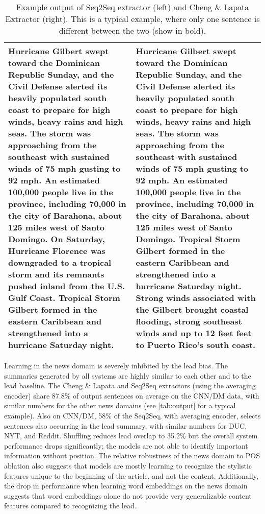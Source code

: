 
\begin{table*}
\centering
  \begin{tabular}{p{20em} p{20em}}
\toprule
Hurricane Gilbert swept toward the Dominican Republic Sunday, and the 
   Civil Defense alerted its heavily populated south coast to prepare 
   for high winds, heavy rains and high seas.                         
The storm was approaching from the southeast with sustained winds of  
   75 mph gusting to 92 mph.                                          
An estimated 100,000 people live in the province, including 70,000 in 
   the city of Barahona, about 125 miles west of Santo Domingo.       
\textbf{On Saturday, Hurricane Florence was downgraded to a tropical storm and
   its remnants pushed inland from the U.S. Gulf Coast.}               
Tropical Storm Gilbert formed in the eastern Caribbean and            
   strengthened into a hurricane Saturday night.  
&
Hurricane Gilbert swept toward the Dominican Republic Sunday, and the 
   Civil Defense alerted its heavily populated south coast to prepare 
   for high winds, heavy rains and high seas.                         
The storm was approaching from the southeast with sustained winds of  
   75 mph gusting to 92 mph.                                          
An estimated 100,000 people live in the province, including 70,000 in 
   the city of Barahona, about 125 miles west of Santo Domingo.       
Tropical Storm Gilbert formed in the eastern Caribbean and            
   strengthened into a hurricane Saturday night.                      
\textbf{Strong winds associated with the Gilbert brought coastal flooding,    
   strong southeast winds and up to 12 feet feet to Puerto Rico's     
   south coast.}   \\
\bottomrule
\end{tabular}
\caption{Example output of Seq2Seq extractor (left) and Cheng 
\& Lapata Extractor (right). This is a typical example, where only one
 sentence is different between the two (show in bold). }
\label{tab:output}
\end{table*}

Learning in the news domain is severely inhibited by the lead bias. 
The summaries generated by all systems are highly similar to each other and to the lead 
baseline. The Cheng \& Lapata and Seq2Seq 
extractors (using the averaging encoder) share 87.8\% of output sentences on average on the CNN/DM data,
with similar numbers for the other news domains (see \autoref{tab:output}
for a typical example).  
Also on CNN/DM, 58\% of the Seq2Seq, with averaging encoder, selects sentences also occurring
in the lead summary, with similar numbers for DUC, NYT, and Reddit. Shuffling
reduces lead overlap to 35.2\% but the overall system performance drops
    significantly; the models are not able to identify important information
    without position.
    The relative robustness of the news domain to POS ablation also 
    suggests that models are mostly learning to recognize the stylistic 
    features unique to the beginning of the article, and not the content.
    Additionally, the drop in performance when learning word embeddings on 
    the news domain suggests that word embeddings alone do not provide 
    very generalizable content features compared to recognizing the lead.

